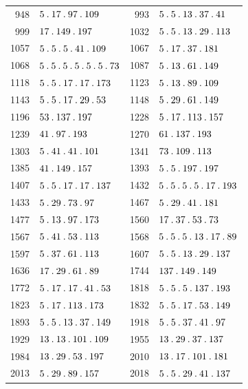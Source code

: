 \begin{longtable}{@{}r|l@{\qquad}r|l@{}}
948 & $5\mathbin{.} 17\mathbin{.} 97\mathbin{.} 109$ & 993 & $5\mathbin{.} 5\mathbin{.} 13\mathbin{.} 37\mathbin{.} 41$\\
999 & $17\mathbin{.} 149\mathbin{.} 197$ & 1032 & $5\mathbin{.} 5\mathbin{.} 13\mathbin{.} 29\mathbin{.} 113$\\
1057 & $5\mathbin{.} 5\mathbin{.} 5\mathbin{.} 41\mathbin{.} 109$ & 1067 & $5\mathbin{.} 17\mathbin{.} 37\mathbin{.} 181$\\
1068 & $5\mathbin{.} 5\mathbin{.} 5\mathbin{.} 5\mathbin{.} 5\mathbin{.} 5\mathbin{.} 73$ & 1087 & $5\mathbin{.} 13\mathbin{.} 61\mathbin{.} 149$\\
1118 & $5\mathbin{.} 5\mathbin{.} 17\mathbin{.} 17\mathbin{.} 173$ & 1123 & $5\mathbin{.} 13\mathbin{.} 89\mathbin{.} 109$\\
1143 & $5\mathbin{.} 5\mathbin{.} 17\mathbin{.} 29\mathbin{.} 53$ & 1148 & $5\mathbin{.} 29\mathbin{.} 61\mathbin{.} 149$\\
1196 & $53\mathbin{.} 137\mathbin{.} 197$ & 1228 & $5\mathbin{.} 17\mathbin{.} 113\mathbin{.} 157$\\
1239 & $41\mathbin{.} 97\mathbin{.} 193$ & 1270 & $61\mathbin{.} 137\mathbin{.} 193$\\
1303 & $5\mathbin{.} 41\mathbin{.} 41\mathbin{.} 101$ & 1341 & $73\mathbin{.} 109\mathbin{.} 113$\\
1385 & $41\mathbin{.} 149\mathbin{.} 157$ & 1393 & $5\mathbin{.} 5\mathbin{.} 197\mathbin{.} 197$\\
1407 & $5\mathbin{.} 5\mathbin{.} 17\mathbin{.} 17\mathbin{.} 137$ & 1432 & $5\mathbin{.} 5\mathbin{.} 5\mathbin{.} 5\mathbin{.} 17\mathbin{.} 193$\\
1433 & $5\mathbin{.} 29\mathbin{.} 73\mathbin{.} 97$ & 1467 & $5\mathbin{.} 29\mathbin{.} 41\mathbin{.} 181$\\
1477 & $5\mathbin{.} 13\mathbin{.} 97\mathbin{.} 173$ & 1560 & $17\mathbin{.} 37\mathbin{.} 53\mathbin{.} 73$\\
1567 & $5\mathbin{.} 41\mathbin{.} 53\mathbin{.} 113$ & 1568 & $5\mathbin{.} 5\mathbin{.} 5\mathbin{.} 13\mathbin{.} 17\mathbin{.} 89$\\
1597 & $5\mathbin{.} 37\mathbin{.} 61\mathbin{.} 113$ & 1607 & $5\mathbin{.} 5\mathbin{.} 13\mathbin{.} 29\mathbin{.} 137$\\
1636 & $17\mathbin{.} 29\mathbin{.} 61\mathbin{.} 89$ & 1744 & $137\mathbin{.} 149\mathbin{.} 149$\\
1772 & $5\mathbin{.} 17\mathbin{.} 17\mathbin{.} 41\mathbin{.} 53$ & 1818 & $5\mathbin{.} 5\mathbin{.} 5\mathbin{.} 137\mathbin{.} 193$\\
1823 & $5\mathbin{.} 17\mathbin{.} 113\mathbin{.} 173$ & 1832 & $5\mathbin{.} 5\mathbin{.} 17\mathbin{.} 53\mathbin{.} 149$\\
1893 & $5\mathbin{.} 5\mathbin{.} 13\mathbin{.} 37\mathbin{.} 149$ & 1918 & $5\mathbin{.} 5\mathbin{.} 37\mathbin{.} 41\mathbin{.} 97$\\
1929 & $13\mathbin{.} 13\mathbin{.} 101\mathbin{.} 109$ & 1955 & $13\mathbin{.} 29\mathbin{.} 37\mathbin{.} 137$\\
1984 & $13\mathbin{.} 29\mathbin{.} 53\mathbin{.} 197$ & 2010 & $13\mathbin{.} 17\mathbin{.} 101\mathbin{.} 181$\\
2013 & $5\mathbin{.} 29\mathbin{.} 89\mathbin{.} 157$ & 2018 & $5\mathbin{.} 5\mathbin{.} 29\mathbin{.} 41\mathbin{.} 137$\\

\end{longtable}

